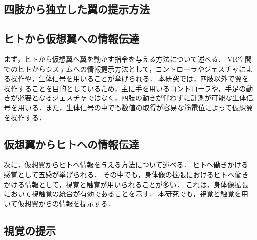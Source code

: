 \begin{small}
\section{四肢から独立した翼の提示方法}


  \subsection{ヒトから仮想翼への情報伝達}
    
    まず，ヒトから仮想翼へ翼を動かす指令を与える方法について述べる．
    VR空間でのヒトからシステムへの情報提示方法として，コントローラやジェスチャによる操作や，生体信号を用いることが挙げられる．
    本研究では，四肢以外で翼を操作することを目的としているため，主に手を用いるコントローラや，手足の動きが必要となるジェスチャではなく，四肢の動きが伴わずに計測が可能な生体信号を用いる．また，生体信号の中でも数値の取得が容易な筋電位によって仮想翼を操作する．

  \subsection{仮想翼からヒトへの情報伝達}
    次に，仮想翼からヒトへ情報を与える方法について述べる．
    ヒトへ働きかける感覚として五感が挙げられる．
    その中でも，身体像の拡張におけるヒトへ働きかける情報として，視覚と触覚が用いられることが多い．
    これは，身体像拡張において視触覚の統合が有効であることを示す．
    本研究でも，視覚と触覚を用いて仮想翼からの情報を提示する．
   

    \subsection{視覚の提示} %
      

\end{small}
